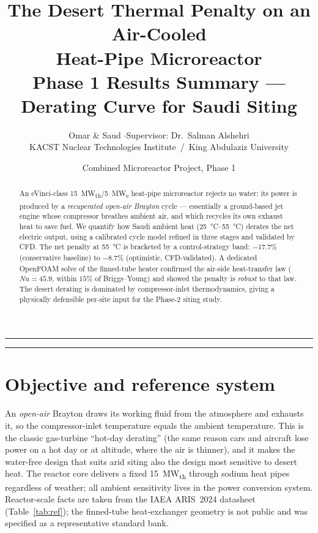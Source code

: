 \documentclass[11pt]{article}
\title{\vspace{-1.6em}\textbf{The Desert Thermal Penalty on an Air-Cooled\\ Heat-Pipe Microreactor}\\[2pt]
\large Phase 1 Results Summary --- Derating Curve for Saudi Siting}
\author{\normalsize Omar \& Saud \quad$\cdot$\quad Supervisor: Dr.\ Salman Alshehri\\[-2pt]
\small KACST Nuclear Technologies Institute \,/\, King Abdulaziz University}
\date{\vspace{-0.6em}\small Combined Microreactor Project, Phase 1}
\begin{document}
\maketitle
\vspace{-1.8em}

\noindent\rule{\linewidth}{0.4pt}
\begin{abstract}\noindent\small
An \mbox{eVinci}-class \SI{15}{MW_{th}}/\SI{5}{MW_e} heat-pipe microreactor rejects no water: its power is produced
by a \emph{recuperated open-air Brayton} cycle --- essentially a ground-based jet engine whose compressor
breathes ambient air, and which recycles its own exhaust heat to save fuel. We quantify how Saudi
ambient heat (\SIrange{25}{55}{\celsius}) derates the net electric output, using a calibrated cycle model refined
in three stages and validated by CFD. The net penalty at \SI{55}{\celsius} is bracketed by a control-strategy
band: \textbf{$-17.7\%$} (conservative baseline) to \textbf{$-8.7\%$} (optimistic, CFD-validated). A dedicated
OpenFOAM solve of the finned-tube heater confirmed the air-side heat-transfer law ($Nu=45.9$, within $15\%$ of
Briggs--Young) and showed the penalty is \emph{robust} to that law. The desert derating is dominated by
compressor-inlet thermodynamics, giving a physically defensible per-site input for the Phase-2 siting study.
\end{abstract}
\noindent\rule{\linewidth}{0.4pt}
\vspace{2pt}

\section{Objective and reference system}
An \emph{open-air} Brayton draws its working fluid from the atmosphere and exhausts it, so the compressor-inlet
temperature equals the ambient temperature. This is the classic gas-turbine ``hot-day derating'' (the same reason
cars and aircraft lose power on a hot day or at altitude, where the air is thinner), and it makes the
water-free design that suits arid siting also the design most sensitive to desert heat. The reactor core delivers a
fixed \SI{15}{MW_{th}} through sodium heat pipes regardless of weather; all ambient sensitivity lives in the power
conversion system. Reactor-scale facts are taken from the IAEA ARIS~2024 datasheet (Table~\ref{tab:ref}); the
finned-tube heat-exchanger geometry is not public and was specified as a representative standard bank.
\end{document}
